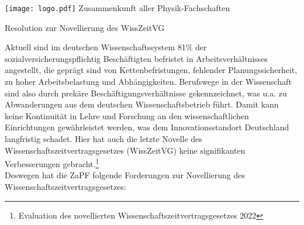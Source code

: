 \documentclass[DIV=calc]{scrartcl}
\begin{document}
\hspace{0.87\textwidth}
\begin{minipage}{120pt}
	\vspace{-1.8cm}
	\texttt{[image: logo.pdf]}
	\centering
	\small Zusammenkunft aller Physik-Fachschaften
\end{minipage}

\begin{center}
  \huge{Resolution zur Novellierung des WissZeitVG}\vspace{.25\baselineskip}\\
  \normalsize
\end{center}
\vspace{1cm}





Aktuell sind im deutschen Wissenschaftssystem 81\% der sozialversicherungspflichtig Beschäftigten befristet in Arbeitsverhältnisses angestellt, die geprägt sind von Kettenbefristungen, fehlender Planungssicherheit, zu hoher Arbeitsbelastung und Abhängigkeiten. Berufswege in der Wissenschaft sind also durch prekäre Beschäftigungsverhältnisse gekennzeichnet, was u.a. zu Abwanderungen aus dem deutschen Wissenschaftsbetrieb führt. Damit kann keine Kontinuität in Lehre und Forschung an den wissenschaftlichen Einrichtungen gewährleistet werden, was dem Innovationsstandort Deutschland langfristig schadet. Hier hat auch die letzte Novelle des Wissenschaftszeitvertragsgesetzes (WissZeitVG) keine signifikanten Verbesserungen gebracht.\footnote{Evaluation des novellierten Wissenschaftszeitvertragsgesetzes 2022}\\

Deswegen hat die ZaPF folgende Forderungen zur Novellierung des Wissenschaftszeitvertragsgesetzes:
\end{document}
